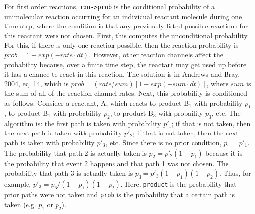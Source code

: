 \documentclass {book}
\begin{document}
\begin{description}
For first order reactions, \texttt{rxn->prob} is the conditional probability of a unimolecular reaction occurring for an individual reactant molecule during one time step, where the condition is that any previously listed possible reactions for this reactant were not chosen.  First, this computes the unconditional probability.  For this, if there is only one reaction possible, then the reaction probability is $prob=1-exp(-rate \cdot dt)$.  However, other reaction channels affect the probability because, over a finite time step, the reactant may get used up before it has a chance to react in this reaction.  The solution is in Andrews and Bray, 2004, eq. 14, which is $prob=(rate/sum)[1-exp(-sum \cdot dt)]$, where $sum$ is the sum of all of the reaction channel rates.  Next, this probability is conditioned as follows.  Consider a reactant, A, which reacts to product B$_1$ with probability $p_{1}$, to product B$_1$ with probability $p_2$, to product B$_3$ with probaility $p_3$, etc.  The algorithm is: the first path is taken with probability $p'_1$; if that is not taken, then the next path is taken with probability $p'_2$; if that is not taken, then the next path is taken with probability $p'_3$, etc.  Since there is no prior condition, $p_1=p'_1$.  The probability that path 2 is actually taken is $p_2=p'_{2}(1-p_1)$ because it is the probability that event 2 happens and that path 1 was not chosen.  The probability that path 3 is actually taken is $p_3=p'_{3}(1-p_1)(1-p_2)$.  Thus, for example, $p'_3=p_3/(1-p_1)(1-p_2)$.  Here, \texttt{product} is the probability that prior paths were not taken and \texttt{prob} is the probability that a certain path is taken (e.g. $p_1$ or $p_2$).


\end{description}
\end{document}
